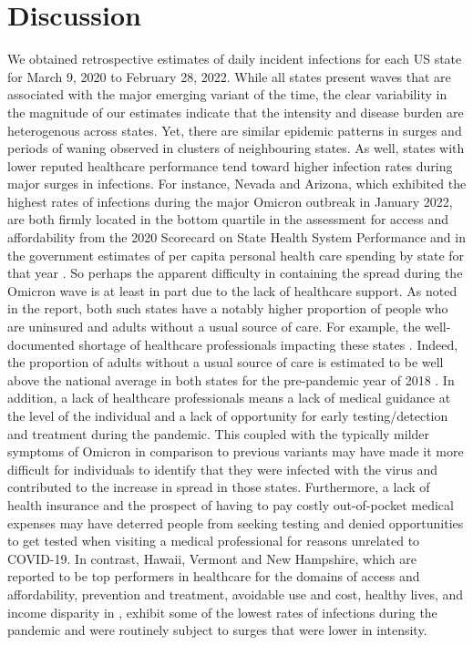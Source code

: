 \documentclass{article}
\begin{document}
\section{Discussion}

We obtained retrospective estimates of daily incident infections for each US
state for March 9, 2020 to February 28, 2022. While all states present waves that
are associated with the major emerging variant of the time, the clear
variability in the magnitude of our estimates indicate that the intensity and
disease burden are heterogenous across states. Yet, there are similar epidemic
patterns in surges and periods of waning observed in clusters of neighbouring
states. As well, states with lower reputed healthcare performance tend toward
higher infection rates during major surges in infections. For instance, Nevada
and Arizona, which exhibited the highest rates of infections during the major
Omicron outbreak in January 2022, are both firmly located in the bottom quartile
in the assessment for access and affordability from the 2020 Scorecard on State
Health System Performance \citep{radley2020} and in the government estimates of
per capita personal health care spending by state for that year
\citep{centers2020health}. So perhaps the apparent difficulty in containing the
spread during the Omicron wave is at least in part due to the lack of healthcare
support. As noted in the report, both such states have a notably higher
proportion of people who are uninsured and adults without a usual source of
care. For example, the well-documented shortage of healthcare professionals
impacting these states \citep{do2023nevada, gong2019higher}. Indeed, the
proportion of adults without a usual source of care is estimated to be well
above the national average in both states for the pre-pandemic year of 2018
\citep{radley2020}. In addition, a lack of healthcare professionals means a lack
of medical guidance at the level of the individual and a lack of opportunity for
early testing/detection and treatment during the pandemic. This coupled with the typically
milder symptoms of Omicron in comparison to previous variants may have made it
more difficult for individuals to identify that they were infected with the
virus and contributed to the increase in spread in those states. Furthermore, a
lack of health insurance and the prospect of having to pay costly out-of-pocket
medical expenses may have deterred people from seeking testing
\citep{embrett2022barriers} and denied opportunities to get tested when visiting
a medical professional for reasons unrelated to COVID-19. In contrast, Hawaii,
Vermont and New Hampshire, which are reported to be top performers in healthcare
for the domains of access and affordability, prevention and treatment, avoidable
use and cost, healthy lives, and income disparity in \citet{radley2020}, exhibit
some of the lowest rates of infections during the pandemic and were routinely subject to
surges that were lower in intensity.
\end{document}
